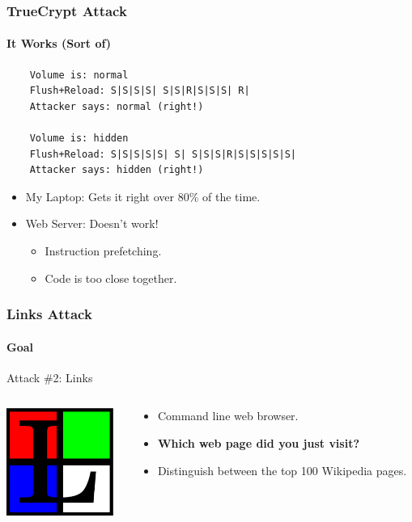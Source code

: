 \documentclass{beamer}
\begin{document}
\begin{frame}[fragile]
    \frametitle{TrueCrypt Attack}
    \framesubtitle{It Works (Sort of)}

\begin{verbatim}
    Volume is: normal
    Flush+Reload: S|S|S|S| S|S|R|S|S|S| R|
    Attacker says: normal (right!)

    Volume is: hidden
    Flush+Reload: S|S|S|S|S| S| S|S|S|R|S|S|S|S|S|
    Attacker says: hidden (right!)
\end{verbatim}

    \begin{itemize}
        \item My Laptop: Gets it right over 80\% of the time.
        \item Web Server: Doesn't work!
            \begin{itemize}
                \item Instruction prefetching.
                \item Code is too close together.
            \end{itemize}
    \end{itemize}

\end{frame}


\begin{frame}
    \frametitle{Links Attack}
    \framesubtitle{Goal}

    \begin{center}
    {\Large Attack \#2: Links}
    \end{center}
    \begin{columns}
        \begin{column}{0.3\textwidth}
            \includegraphics[width=3.5cm,keepaspectratio]{linkslogo.png}
        \end{column}
        \begin{column}{0.7\textwidth}
        \begin{itemize}
            \item Command line web browser.
            \item \textbf{Which web page did you just visit?}
            \item Distinguish between the top 100 Wikipedia pages.
        \end{itemize}
        \end{column}
    \end{columns}
\end{frame}
\end{document}
